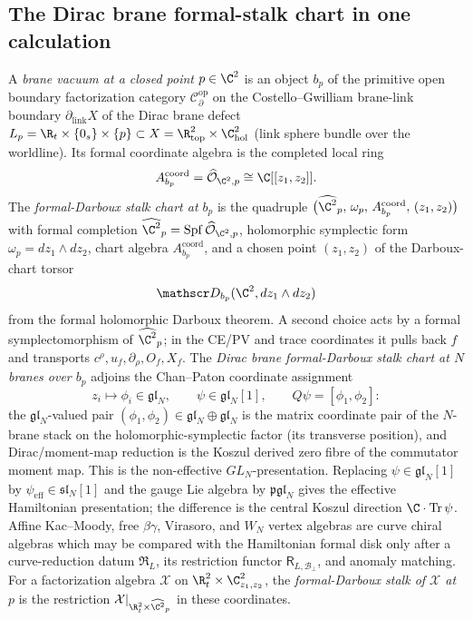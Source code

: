 \documentclass[11pt]{memoir}
\begin{document}
\subsection{The Dirac brane formal-stalk chart in one calculation}\label{ssec:formal-darboux-stalk-one-calculation}

\begin{defn}
\label{def:formal-darboux-stalk-chart}
A \emph{brane vacuum at a closed point} \(p\in\C^2\) is an object
\(b_p\) of the primitive open boundary factorization category
\(\mathcal{C}^{\mathrm{op}}_\partial\) on the Costello--Gwilliam
brane-link boundary \(\partial_{\mathrm{link}}X\) of the Dirac brane defect
\(L_p=\R_t\times\{0_s\}\times\{p\}
\subset X=\R^2_{\mathrm{top}}\times\C^2_{\mathrm{hol}}\)
(link sphere bundle over the worldline).  Its formal coordinate
algebra is the completed local ring
\[
  A^{\mathrm{coord}}_{b_p}
   =\widehat{\mathcal O}_{\C^2,p}\cong\C[[z_1,z_2]].
\]
The \emph{formal-Darboux stalk chart at \(b_p\)} is the quadruple
\(\bigl(\widehat{\C^2}_p,\,\omega_p,\,A^{\mathrm{coord}}_{b_p},\,(z_1,z_2)\bigr)\) with
formal completion
\(\widehat{\C^2}_p=\operatorname{Spf}\widehat{\mathcal O}_{\C^2,p}\),
holomorphic symplectic form \(\omega_p=dz_1\wedge dz_2\), chart algebra
\(A^{\mathrm{coord}}_{b_p}\), and a chosen point \((z_1,z_2)\) of the
Darboux-chart torsor
\[
  \mathscr D_{b_p}(\C^2,dz_1\wedge dz_2)
\]
from the formal holomorphic Darboux theorem.  A second choice acts by a
formal symplectomorphism of \(\widehat{\C^2}_p\); in the CE/PV and trace
coordinates it pulls back \(f\) and transports
\(c^\rho,u_f,\partial_\rho,O_f,X_f\).  The \emph{Dirac brane
formal-Darboux stalk chart at \(N\) branes over \(b_p\)} adjoins the
Chan--Paton coordinate assignment
\[
  z_i\mapsto\phi_i\in\mathfrak{gl}_N,\qquad
	  \psi\in\mathfrak{gl}_N[1],\qquad
	  Q\psi=[\phi_1,\phi_2]:
	\]
	the \(\mathfrak{gl}_N\)-valued pair
	\((\phi_1,\phi_2)\in\mathfrak{gl}_N\oplus\mathfrak{gl}_N\) is the
	matrix coordinate pair of the \(N\)-brane stack on the holomorphic-symplectic
	factor (its transverse position), and Dirac/moment-map reduction is
	the Koszul derived zero fibre of the commutator moment map.  This is
	the non-effective \(GL_N\)-presentation.  Replacing
	\(\psi\in\mathfrak{gl}_N[1]\) by
	\(\psi_{\mathrm{eff}}\in\mathfrak{sl}_N[1]\) and the gauge Lie algebra
	by \(\mathfrak{pgl}_N\) gives the effective Hamiltonian presentation;
	the difference is the central Koszul direction
	\(\C\cdot\operatorname{Tr}\psi\).
Affine Kac--Moody, free \(\beta\gamma\), Virasoro, and \(W_N\)
vertex algebras are curve chiral algebras which may be compared with the
Hamiltonian formal disk only after a curve-reduction datum
\(\mathfrak R_L\), its restriction functor
\(\mathsf R_{L,\mathcal B_\perp}\), and anomaly matching.  For a
factorization algebra \(\mathcal X\) on
\(\R^2_t\times\C^2_{z_1,z_2}\), the \emph{formal-Darboux stalk of
\(\mathcal X\) at \(p\)} is the restriction
\(\mathcal X|_{\R^2_t\times\widehat{\C^2}_p}\) in these coordinates.
\end{defn}
\end{document}
